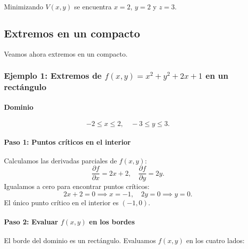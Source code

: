 \documentclass[11pt]{book}
\newcounter{cuent}
\theoremstyle{definicion}
\theoremstyle{teorema}
\theoremstyle{ejemplo}
\begin{document}
%

%

Minimizando $V(x,y)$ se encuentra $x=2$, $y=2$ y $z=3$.

\subsection{Extremos en un compacto}



\noindent
Veamos ahora extremos en un compacto.

\subsubsection{Ejemplo 1: Extremos de \( f(x, y) = x^2 + y^2 + 2x + 1 \) en un rectángulo}

\paragraph{Dominio}
\[
-2 \leq x \leq 2, \quad -3 \leq y \leq 3.
\]

\paragraph{Paso 1: Puntos críticos en el interior}

Calculamos las derivadas parciales de \( f(x, y) \):
\[
\frac{\partial f}{\partial x} = 2x + 2, \quad \frac{\partial f}{\partial y} = 2y.
\]
Igualamos a cero para encontrar puntos críticos:
\[
2x + 2 = 0 \implies x = -1, \quad 2y = 0 \implies y = 0.
\]
El único punto crítico en el interior es \( (-1, 0) \). 

\paragraph*{Paso 2: Evaluar \( f(x, y) \) en los bordes}

\noindent
El borde del dominio es un rectángulo. Evaluamos \( f(x, y) \) en los cuatro lados:
\end{document}
